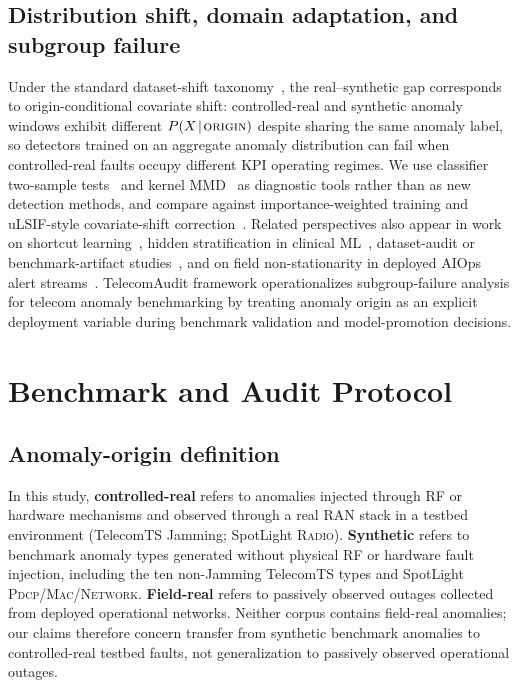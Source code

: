 \documentclass[sigconf,review]{acmart}
\begin{document}
\subsection{Distribution shift, domain adaptation, and subgroup failure}
Under the standard dataset-shift taxonomy~\citep{quinonero2009shift,morenotorres2012unifying}, the real--synthetic gap corresponds to origin-conditional covariate shift: controlled-real and synthetic anomaly windows exhibit different $P(X\!\mid\!\textsc{origin})$ despite sharing the same anomaly label, so detectors trained on an aggregate anomaly distribution can fail when controlled-real faults occupy different KPI operating regimes. We use classifier two-sample tests~\citep{lopezpaz2017c2st} and kernel MMD~\citep{gretton2012mmd} as diagnostic tools rather than as new detection methods, and compare against importance-weighted training and uLSIF-style covariate-shift correction~\citep{sugiyama2007covariate,kanamori2009ulsif,bickel2009dasvm}. Related perspectives also appear in work on shortcut learning~\citep{geirhos2020shortcut}, hidden stratification in clinical ML~\citep{oakden2020hidden}, dataset-audit or benchmark-artifact studies~\citep{recht2019imagenet}, and on field non-stationarity in deployed AIOps alert streams~\citep{bhukar2024dynamic}. TelecomAudit framework operationalizes subgroup-failure analysis for telecom anomaly benchmarking by treating anomaly origin as an explicit deployment variable during benchmark validation and model-promotion decisions.

\section{Benchmark and Audit Protocol}
\label{sec:setup}

\subsection{Anomaly-origin definition}
In this study, \textbf{controlled-real} refers to anomalies injected through RF or hardware mechanisms and observed through a real RAN stack in a testbed environment (TelecomTS Jamming; SpotLight \textsc{Radio}). \textbf{Synthetic} refers to benchmark anomaly types generated without physical RF or hardware fault injection, including the ten non-Jamming TelecomTS types and SpotLight \textsc{Pdcp}/\textsc{Mac}/\textsc{Network}. \textbf{Field-real} refers to passively observed outages collected from deployed operational networks. Neither corpus contains field-real anomalies; our claims therefore concern transfer from synthetic benchmark anomalies to controlled-real testbed faults, not generalization to passively observed operational outages.
\end{document}
